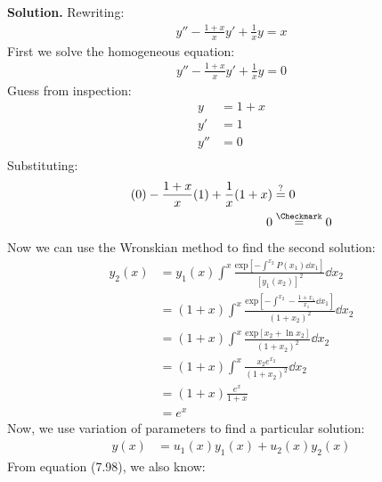 \documentclass{article}
\begin{document}
\textbf{Solution.} Rewriting:
\begin{equation*}
\begin{aligned}
	y'' - \frac{1+x}{x}y' + \frac{1}{x}y = x
\end{aligned}
\end{equation*}
First we solve the homogeneous equation:
\begin{equation*}
\begin{aligned}
	y'' - \frac{1+x}{x}y' + \frac{1}{x}y = 0
\end{aligned}
\end{equation*}
Guess from inspection:
\begin{equation*}
\begin{aligned}
	y &= 1+x \\
	y' &= 1 \\
	y'' &= 0 \\
\end{aligned}
\end{equation*}
Substituting:
\begin{equation*}
\begin{aligned}
	(0) - \frac{1+x}{x}(1) + \frac{1}{x}(1+x) &\overset{?}{=} 0 \\
	0 &\overset{\Checkmark}{=} 0
\end{aligned}
\end{equation*}
Now we can use the Wronskian method to find the second solution:
\begin{equation*}
\begin{aligned}
	y_2(x) &= y_1(x)\int^x \frac{\text{exp}\left[-\int^{x_2}P(x_1)\dd x_1\right]}{[y_1(x_2)]^2}\dd x_2 \\
		&= (1+x)\int^x \frac{\text{exp}\left[-\int^{x_2}-\frac{1+x_1}{x_1}\dd x_1\right]}{(1+x_2)^2}\dd x_2 \\
		&= (1+x)\int^x \frac{\text{exp}[x_2 + \ln{x_2}]}{(1+x_2)^2}\dd x_2 \\
		&= (1+x)\int^x \frac{x_2 e^{x_2}}{(1+x_2)^2}\dd x_2 \\
		&= (1+x)\frac{e^x}{1+x} \\
		&= e^x
\end{aligned}
\end{equation*}
Now, we use variation of parameters to find a particular solution:
\begin{equation*}
\begin{aligned}
	y(x) &= u_1(x)y_1(x) + u_2(x)y_2(x)
\end{aligned}
\end{equation*}
From equation (7.98), we also know:
\end{document}
